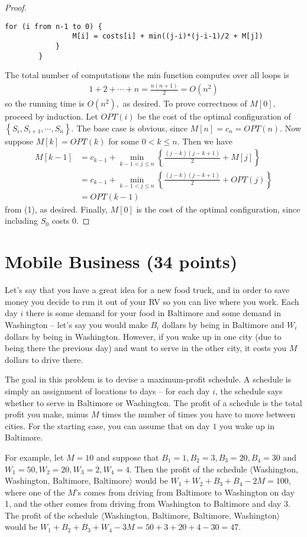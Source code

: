 \documentclass{article}
\begin{document}
\begin{proof}
\begin{Verbatim}[tabsize=4]
			for (i from n-1 to 0) {
				M[i] = costs[i] + min((j-i)*(j-i-1)/2 + M[j])
			}
		}
	\end{Verbatim}
	The total number of computations the min function computes over all loops is
	\begin{align*}
		1+2+\cdots+n = \frac{n(n+1)}{2} = O(n^2)
	\end{align*}
	so the running time is $O(n^2),$ as desired. To prove correctness of $M[0],$ proceed by induction. Let $OPT(i)$ be the cost of the optimal configuration of $\left\{ S_i, S_{i+1}, \cdots, S_n \right\}.$ The base case is obvious, since $M[n]=c_n=OPT(n).$ Now suppose $M[k] = OPT(k)$ for some $0 <k\le n.$ Then we have
	\begin{align*}
		M[k-1] &= c_{k-1} + \min_{k-1<j\le n} \left\{ \frac{(j-k)(j-k+1)}{2} + M[j] \right\} \\
		&= c_{k-1} + \min_{k-1<j\le n} \left\{ \frac{(j-k)(j-k+1)}{2} + OPT(j) \right\} \\
		&= OPT(k-1)
	\end{align*}
	from (1), as desired. Finally, $M[0]$ is the cost of the optimal configuration, since including $S_0$ costs 0.
\end{proof}

\newpage
\section{Mobile Business (34 points)}

Let's say that you have a great idea for a new food truck, and in order to save money you decide to run it out of your RV so you can live where you work.  Each day $i$ there is some demand for your food in Baltimore and some demand in Washington -- let's say you would make $B_i$ dollars by being in Baltimore and $W_i$ dollars by being in Washington.  However, if you wake up in one city (due to being there the previous day) and want to serve in the other city, it costs you $M$ dollars to drive there.  

The goal in this problem is to devise a maximum-profit schedule.  A schedule is simply an assignment of locations to days -- for each day $i$, the schedule says whether to serve in Baltimore or Washington.  The profit of a schedule is the total profit you make, minus $M$ times the number of times you have to move between cities.  For the starting case, you can assume that on day $1$ you wake up in Baltimore.

For example, let $M = 10$ and suppose that $B_1 = 1, B_2 = 3, B_3 = 20, B_4 = 30$ and $W_1 = 50, W_2 = 20, W_3 = 2, W_4 = 4$.  Then the profit of the schedule $\langle$Washington, Washington, Baltimore, Baltimore$\rangle$ would be $W_1 + W_2 + B_3 + B_4 - 2M = 100$, where one of the $M$'s comes from driving from Baltimore to Washington on day 1, and the other comes from driving from Washington to Baltimore and day 3.  The profit of the schedule $\langle$Washington, Baltimore, Baltimore, Washington$\rangle$ would be $W_1 + B_2 + B_3 + W_4 - 3M = 50 +3 + 20 + 4 - 30 = 47$.
\end{document}
